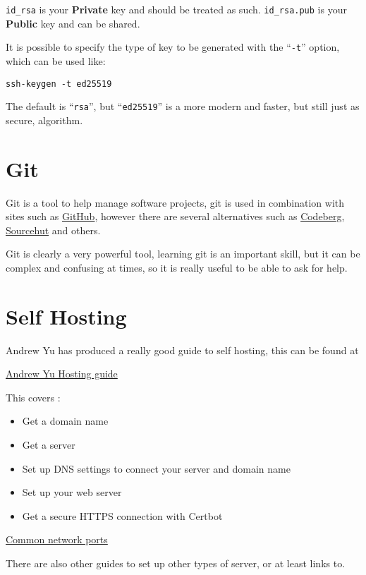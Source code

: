 \documentclass{book}
\begin{document}
\verb|id_rsa| is your \textbf{Private} key and should be treated as such. \verb|id_rsa.pub| is your \textbf{Public} key and can be shared.

It is possible to specify the type of key to be generated with the ``\verb|-t|'' option, which can be used like:

\begin{verbatim}
ssh-keygen -t ed25519
\end{verbatim}

The default is ``\verb|rsa|'', but ``\verb|ed25519|'' is a more modern and faster, but still just as secure, algorithm.

\section{Git}

Git is a tool to help manage software projects, git is used in combination with sites such as \href{https://github.com/}{GitHub}, however there are several alternatives such as
\href{https://codeberg.org/}{Codeberg}, \href{https://sr.ht/}{Sourcehut} and others.

Git is clearly a very powerful tool, learning git is an important skill, but it can be complex and confusing at times, so it is really useful to be able to ask for help.



\section{Self Hosting}

Andrew Yu has produced a really good guide to self hosting, this can be found at

\href{https://host.andrewyu.org/}{Andrew Yu Hosting guide}

This covers :

\begin{itemize}
\item Get a domain name
\item Get a server
\item Set up DNS settings to connect your server and domain name
\item Set up your web server
\item Get a secure HTTPS connection with Certbot
\end{itemize}

\href{https://networkverge.com/common-ports/}{Common network ports}

There are also other guides to set up other types of server, or at least links to.
\end{document}
